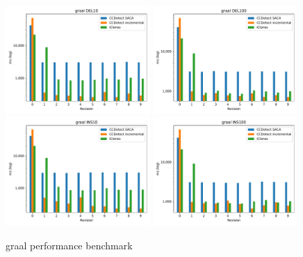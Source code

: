 \begin{figure}[H]
    \begin{center}
        \includegraphics[width=0.49\textwidth]{figures/performancegraphs/graal_DEL10.pdf}
        \includegraphics[width=0.49\textwidth]{figures/performancegraphs/graal_DEL100.pdf}
        \includegraphics[width=0.49\textwidth]{figures/performancegraphs/graal_INS10.pdf}
        \includegraphics[width=0.49\textwidth]{figures/performancegraphs/graal_INS100.pdf}
    \end{center}
    \caption{graal performance benchmark}
    \label{fig:graal}
\end{figure}

